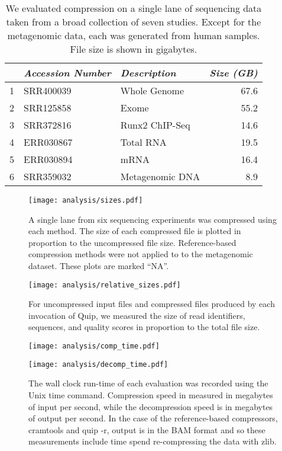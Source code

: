 \documentclass[twocolumn]{article}
\begin{document}
\begin{table}
\begin{tabular}{rllr}
  & \textit{Accession Number} & \textit{Description} & \textit{Size (GB)} \\ \hline
1 & SRR400039                 & Whole Genome         & 67.6 \\
2 & SRR125858                 & Exome                & 55.2 \\
3 & SRR372816                 & Runx2 ChIP-Seq       & 14.6 \\
4 & ERR030867                 & Total RNA            & 19.5 \\
5 & ERR030894                 & mRNA                 & 16.4 \\
6 & SRR359032                 & Metagenomic DNA      &  8.9 \\
\end{tabular}
\caption{
We evaluated compression on a single lane of sequencing data taken from a
broad collection of seven studies. Except for the metagenomic data, each was
generated from human samples. File size is shown in gigabytes.
}
\label{tab:datasets}
\end{table}


\begin{figure*}
\centerline{\texttt{[image: analysis/sizes.pdf]}}
\caption{
A single lane from six sequencing experiments was compressed using each
method. The size of each compressed file is plotted in proportion to the
uncompressed file size. Reference-based compression methods were not applied to
to the metagenomic dataset. These plots are marked ``NA''.
}
\label{fig:sizes}
\end{figure*}


\begin{figure*}
\centerline{\texttt{[image: analysis/relative\_sizes.pdf]}}
\caption{For uncompressed input files and compressed files produced by each invocation of Quip, we measured the size of read identifiers, sequences, and quality scores in proportion to the total file size.}
\label{fig:relative_sizes}
\end{figure*}

\begin{figure*}
\centerline{\texttt{[image: analysis/comp\_time.pdf]}}
\centerline{\texttt{[image: analysis/decomp\_time.pdf]}}
\caption{
The wall clock run-time of each evaluation was recorded using the Unix time
command. Compression speed in measured in megabytes of input per second, while
the decompression speed is in megabytes of output per second. In the case of
the reference-based compressors, cramtools and quip -r, output is in the BAM
format and so these measurements include time spend re-compressing the data
with zlib.
}
\label{fig:comp_decomp_time}
\end{figure*}
\end{document}
